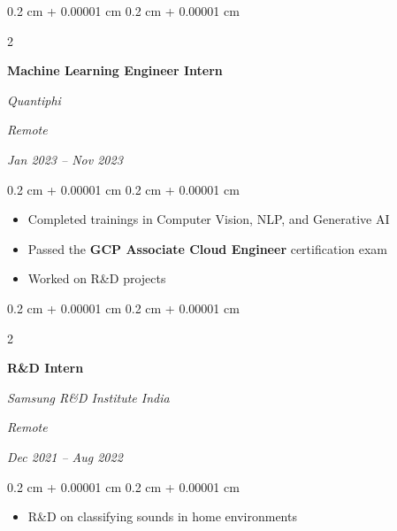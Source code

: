 \documentclass[10pt, letterpaper]{article}
\newenvironment{highlights}{
    \begin{itemize}[
        topsep=0.10 cm,
        parsep=0.10 cm,
        partopsep=0pt,
        itemsep=0pt,
        leftmargin=0.4 cm + 10pt
    ]
}{
    \end{itemize}
} %
\newenvironment{onecolentry}{
    \begin{adjustwidth}{
        0.2 cm + 0.00001 cm
    }{
        0.2 cm + 0.00001 cm
    }
}{
    \end{adjustwidth}
} %
\newenvironment{twocolentry}[2][]{
    \onecolentry
    \def\secondColumn{#2}
    \setcolumnwidth{\fill, 4.5 cm}
    \begin{paracol}{2}
}{
    \switchcolumn \raggedleft \secondColumn
    \end{paracol}
    \endonecolentry
} %
\begin{document}
        \vspace{0.2 cm}

        \begin{twocolentry}{
        \textit{Remote}    
            
        \textit{Jan 2023 – Nov 2023}}
            \textbf{Machine Learning Engineer Intern}
            
            \textit{Quantiphi}
        \end{twocolentry}

        \vspace{0.10 cm}
        \begin{onecolentry}
            \begin{highlights}
                \item Completed trainings in Computer Vision, NLP, and Generative AI
                \item Passed the \textbf{GCP Associate Cloud Engineer} certification exam
                \item Worked on R\&D projects
            \end{highlights}
        \end{onecolentry}

        \vspace{0.2 cm}

        \begin{twocolentry}{
        \textit{Remote}    
            
        \textit{Dec 2021 – Aug 2022}}
            \textbf{R\&D Intern}
            
            \textit{Samsung R\&D Institute India}
        \end{twocolentry}

        \vspace{0.10 cm}
        \begin{onecolentry}
            \begin{highlights}
                \item R\&D on classifying sounds in home environments
            \end{highlights}
        \end{onecolentry}

        \vspace{0.2 cm}
\end{document}
